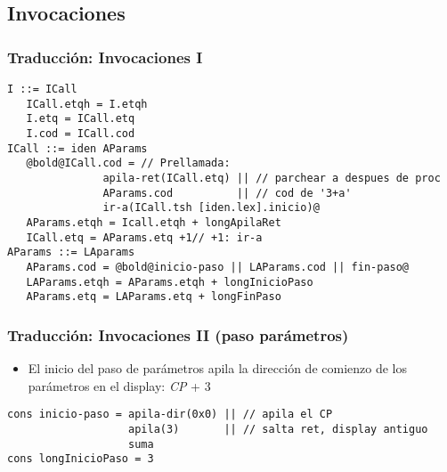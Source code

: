 \documentclass[hyperref={pdfpagelabels=false},tree-dvips,compress]{beamer}
\begin{document}
\subsection{Invocaciones}
\begin{frame}[fragile]
\frametitle{Traducción: Invocaciones I}

\begin{lstlisting}[style=gramaticas,basicstyle=\scriptsize\ttfamily,mathescape]
I ::= ICall
   ICall.etqh = I.etqh
   I.etq = ICall.etq
   I.cod = ICall.cod
ICall ::= iden AParams
   @bold@ICall.cod = // Prellamada:
               apila-ret(ICall.etq) || // parchear a despues de proc
               AParams.cod          || // cod de '3+a'
               ir-a(ICall.tsh [iden.lex].inicio)@
   AParams.etqh = Icall.etqh + longApilaRet
   ICall.etq = AParams.etq +1// +1: ir-a
AParams ::= LAparams
   AParams.cod = @bold@inicio-paso || LAParams.cod || fin-paso@
   LAParams.etqh = AParams.etqh + longInicioPaso
   AParams.etq = LAParams.etq + longFinPaso
\end{lstlisting}

\end{frame}
\begin{frame}[fragile]
\frametitle{Traducción: Invocaciones II (paso parámetros)}

\begin{itemize}
	\item El inicio del paso de parámetros apila la dirección de comienzo de los parámetros en el display: \emph{CP} + 3
\end{itemize}

\begin{lstlisting}[style=codigoMP,basicstyle=\scriptsize\ttfamily,mathescape]
cons inicio-paso = apila-dir(0x0) || // apila el CP
                   apila(3)       || // salta ret, display antiguo
                   suma
cons longInicioPaso = 3
\end{lstlisting}

\end{frame}
\end{document}

